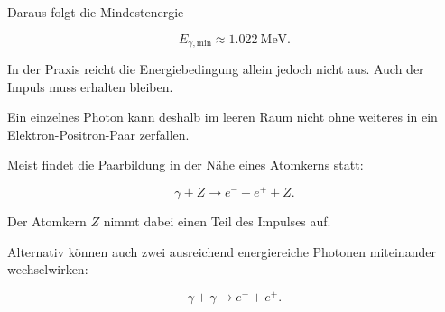 Daraus folgt die Mindestenergie

\begin{equation}
	E_{\gamma,\mathrm{min}}
	\approx
	\SI{1.022}{\mega\electronvolt}.
	\label{eq:mindestenergie_paarbildung_positron}
\end{equation}

In der Praxis reicht die Energiebedingung allein jedoch nicht aus. Auch
der Impuls muss erhalten bleiben.

Ein einzelnes Photon kann deshalb im leeren Raum nicht ohne weiteres
in ein Elektron-Positron-Paar zerfallen.

Meist findet die Paarbildung in der Nähe eines Atomkerns statt:

\begin{equation}
	\gamma
	+
	Z
	\longrightarrow
	e^-
	+
	e^+
	+
	Z.
	\label{eq:paarbildung_atomkern}
\end{equation}

Der Atomkern \(Z\) nimmt dabei einen Teil des Impulses auf.

Alternativ können auch zwei ausreichend energiereiche Photonen
miteinander wechselwirken:

\begin{equation}
	\gamma
	+
	\gamma
	\longrightarrow
	e^-
	+
	e^+.
	\label{eq:breit_wheeler_paarbildung}
\end{equation}

